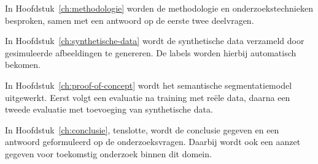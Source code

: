 In Hoofdstuk~\ref{ch:methodologie} worden de methodologie en onderzoekstechnieken besproken, samen met een antwoord op de eerste twee deelvragen.


In Hoofdstuk~\ref{ch:synthetische-data} wordt de synthetische data verzameld door gesimuleerde afbeeldingen te genereren. De labels worden hierbij automatisch bekomen.

In Hoofdstuk~\ref{ch:proof-of-concept} wordt het semantische segmentatiemodel uitgewerkt. Eerst volgt een evaluatie na training met reële data, daarna een tweede evaluatie met toevoeging van synthetische data.

In Hoofdstuk~\ref{ch:conclusie}, tenslotte, wordt de conclusie gegeven en een antwoord geformuleerd op de onderzoeksvragen. Daarbij wordt ook een aanzet gegeven voor toekomstig onderzoek binnen dit domein.